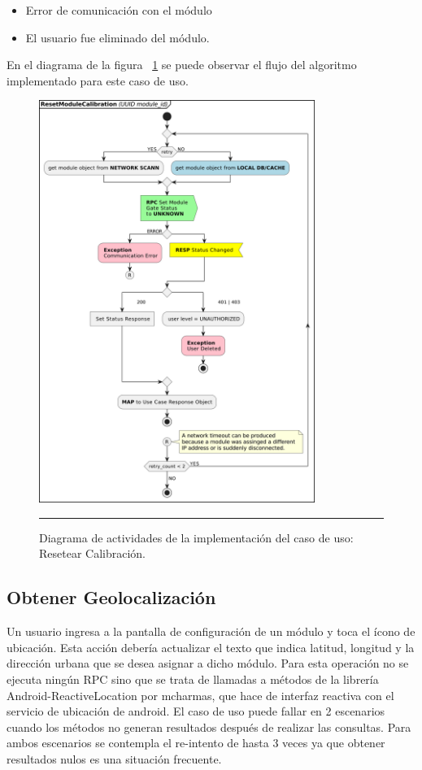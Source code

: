 \begin{itemize}
	\item Error de comunicación con el módulo
	\item El usuario fue eliminado del módulo.
\end{itemize}

En el diagrama de la figura ~\ref{fig:act_resetCalib} se puede observar el flujo del algoritmo implementado para este caso de uso.
\begin{figure}[htbp]
	\centering
	\includegraphics[width=0.8\textwidth]{Figures/iter2/ACT_resetCalib.png}
	\rule{35em}{1pt}
	\caption[Actividades Resetear Calibración]{Diagrama de actividades de la implementación del caso de uso: Resetear Calibración.}
	\label{fig:act_resetCalib}
\end{figure}

\subsection{Obtener Geolocalización}
Un usuario ingresa a la pantalla de configuración de un módulo y toca el ícono de ubicación.
Esta acción debería actualizar el texto que indica latitud, longitud y la dirección urbana que se desea asignar a dicho módulo.
Para esta operación no se ejecuta ningún RPC sino que se trata de llamadas a métodos de la librería Android-ReactiveLocation por mcharmas, que hace de interfaz reactiva con el servicio de ubicación de android.
El caso de uso puede fallar en 2 escenarios cuando los métodos no generan resultados después de realizar las consultas.
Para ambos escenarios se contempla el re-intento de hasta 3 veces ya que obtener resultados nulos es una situación frecuente.

